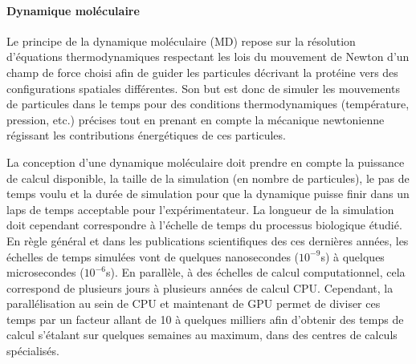 \paragraph{Dynamique moléculaire}

Le principe de la dynamique moléculaire (MD) repose sur la résolution d'équations thermodynamiques respectant les lois du mouvement de Newton d'un champ de force choisi afin de guider les particules décrivant la protéine vers des configurations spatiales différentes. Son but est donc de simuler les mouvements de particules dans le temps pour des conditions thermodynamiques (température, pression, etc.) précises tout en prenant en compte la mécanique newtonienne régissant les contributions énergétiques de ces particules.

La conception d'une dynamique moléculaire doit prendre en compte la puissance de calcul disponible, la taille de la simulation (en nombre de particules), le pas de temps voulu et la durée de simulation pour que la dynamique puisse finir dans un laps de temps acceptable pour l'expérimentateur. La longueur de la simulation doit cependant correspondre à l'échelle de temps du processus biologique étudié. En règle général et dans les publications scientifiques des ces dernières années, les échelles de temps simulées vont de quelques nanosecondes ($10^{-9}$s) à quelques microsecondes ($10^{-6}$s). En parallèle, à des échelles de calcul computationnel, cela correspond de plusieurs jours à plusieurs années de calcul CPU. Cependant, la parallélisation au sein de CPU et maintenant de GPU permet de diviser ces temps par un facteur allant de 10 à quelques milliers afin d'obtenir des temps de calcul s'étalant sur quelques semaines au maximum, dans des centres de calculs spécialisés.

